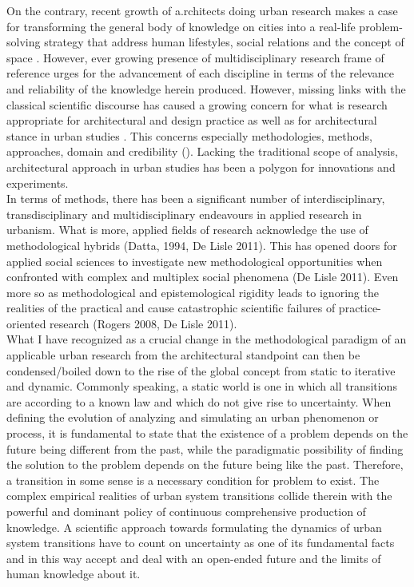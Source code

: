 \documentclass[11pt]{report}
\begin{document}
On the contrary, recent growth of a.rchitects doing urban research makes a case for transforming the general body of knowledge on cities into a real-life problem-solving strategy that address human lifestyles, social relations and the concept of space \href{Castells 2000, Dijk 2002 add more}{\citealt{Castells 2000, Dijk 2002 add more}}.
However, ever growing presence of multidisciplinary research frame of reference urges for the advancement of each discipline in terms of the relevance and reliability of the knowledge herein produced.
However, missing links with the classical scientific discourse has caused a growing concern for what is research appropriate for architectural and design practice as well as for architectural stance in urban studies \href{ref}{\citealt{ref}}. This concerns especially methodologies, methods, approaches, domain and credibility (\href{ref+Savic 2016b}{\citealt{ref+Savic 2016b}}). Lacking the traditional scope of analysis, architectural approach in urban studies has been a polygon for innovations and experiments.
\\
In terms of methods, there has been a significant number of interdisciplinary, transdisciplinary and multidisciplinary endeavours in applied research in urbanism. What is more, applied fields of research acknowledge the use of methodological hybrids (Datta, 1994, De Lisle 2011). This has opened doors for applied social sciences to investigate new methodological opportunities when confronted with complex and multiplex social phenomena (De Lisle 2011). Even more so as methodological and epistemological rigidity leads to ignoring the realities of the practical and cause catastrophic scientific failures of practice-oriented research (Rogers 2008, De Lisle 2011).
\\
What I have recognized as a crucial change in the methodological paradigm of an applicable urban research from the architectural standpoint can then be condensed/boiled down to the rise of the global concept from static to iterative and dynamic. Commonly speaking, a static world is one in which all transitions are according to a known law and which do not give rise to uncertainty. When defining the evolution of analyzing and simulating an urban phenomenon or process, it is fundamental to state that the existence of a problem depends on the future being different from the past, while the paradigmatic possibility of finding the solution to the problem depends on the future being like the past. Therefore, a transition in some sense is a necessary condition for problem to exist. The complex empirical realities of urban system transitions collide therein with the powerful and dominant policy of continuous comprehensive production of knowledge. A scientific approach towards formulating the dynamics of urban system transitions have to count on uncertainty as one of its fundamental facts and in this way accept and deal with an open-ended future and the limits of human knowledge about it.
\end{document}
